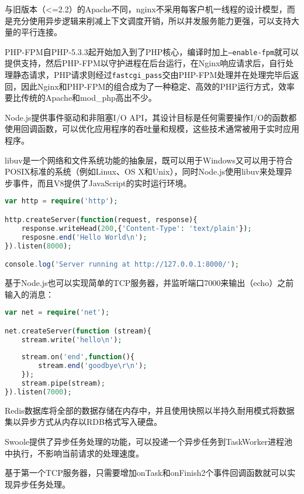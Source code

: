 与旧版本（<=2.2）的Apache不同，nginx不采用每客户机一线程的设计模型，而是充分使用异步逻辑来削减上下文调度开销，所以并发服务能力更强，可以支持大量的平行连接。

PHP-FPM自PHP-5.3.3起开始加入到了PHP核心，编译时加上\texttt{--enable-fpm}就可以提供支持，然后PHP-FPM以守护进程在后台运行，在Nginx响应请求后，自行处理静态请求，PHP请求则经过\texttt{fastcgi\_pass}交由PHP-FPM处理并在处理完毕后返回，因此Nginx和PHP-FPM的组合成为了一种稳定、高效的PHP运行方式，效率要比传统的Apache和mod\_php高出不少。

Node.js提供事件驱动和非阻塞I/O API，其设计目标是任何需要操作I/O的函数都使用回调函数，可以优化应用程序的吞吐量和规模，这些技术通常被用于实时应用程序。

libuv是一个网络和文件系统功能的抽象层，既可以用于Windows又可以用于符合POSIX标准的系统（例如Linux、OS X和Unix），同时Node.js使用libuv来处理异步事件，而且V8提供了JavaScript的实时运行环境。

\begin{lstlisting}[language=PHP]
var http = require('http');

http.createServer(function(request, response){
	response.writeHead(200,{'Content-Type': 'text/plain'});
	resposne.end('Hello World\n');
}).listen(8000);

console.log('Server running at http://127.0.0.1:8000/');
\end{lstlisting}

基于Node.js也可以实现简单的TCP服务器，并监听端口7000来输出（echo）之前输入的消息：

\begin{lstlisting}[language=PHP]
var net = require('net');

net.createServer(function (stream){
	stream.write('hello\n');
	
	stream.on('end',function(){
		stream.end('goodbye\r\n');
	});
	stream.pipe(stream);
}).listen(7000);
\end{lstlisting}

Redis数据库将全部的数据存储在内存中，并且使用快照以半持久耐用模式将数据集以异步方式从内存以RDB格式写入硬盘。

Swoole提供了异步任务处理的功能，可以投递一个异步任务到TaskWorker进程池中执行，不影响当前请求的处理速度。

基于第一个TCP服务器，只需要增加onTask和onFinish2个事件回调函数就可以实现异步任务处理。

